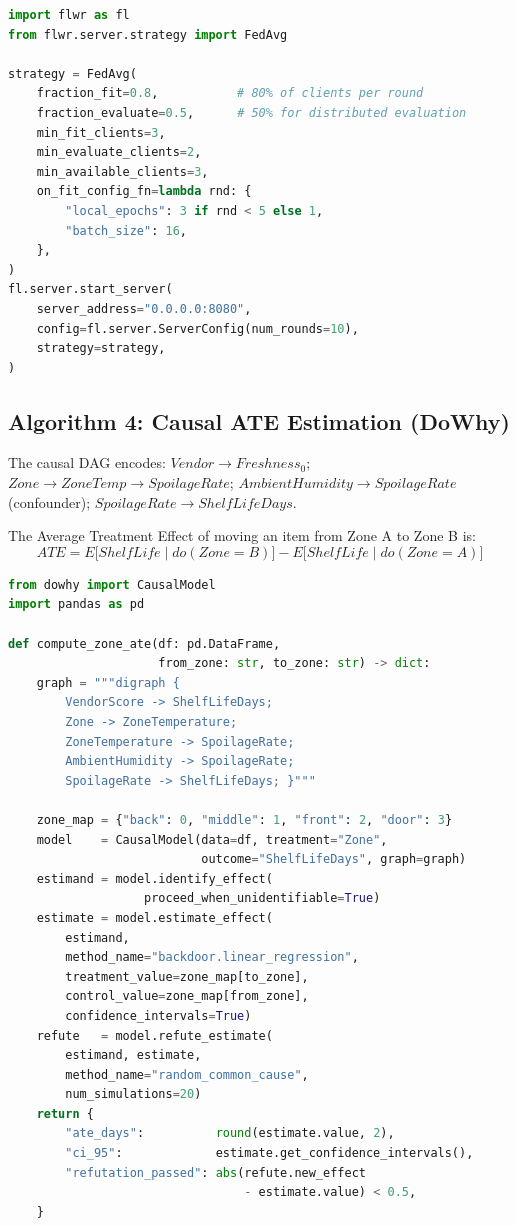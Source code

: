 \documentclass[12pt,a4paper]{report}
\begin{document}
\begin{lstlisting}[language=Python, caption={Flower Server: FedAvg Strategy Configuration}]
import flwr as fl
from flwr.server.strategy import FedAvg

strategy = FedAvg(
    fraction_fit=0.8,           # 80% of clients per round
    fraction_evaluate=0.5,      # 50% for distributed evaluation
    min_fit_clients=3,
    min_evaluate_clients=2,
    min_available_clients=3,
    on_fit_config_fn=lambda rnd: {
        "local_epochs": 3 if rnd < 5 else 1,
        "batch_size": 16,
    },
)
fl.server.start_server(
    server_address="0.0.0.0:8080",
    config=fl.server.ServerConfig(num_rounds=10),
    strategy=strategy,
)
\end{lstlisting}

\subsection{Algorithm 4: Causal ATE Estimation (DoWhy)}
The causal DAG encodes: $Vendor \rightarrow Freshness_0$; $Zone \rightarrow ZoneTemp \rightarrow SpoilageRate$; $AmbientHumidity \rightarrow SpoilageRate$ (confounder); $SpoilageRate \rightarrow ShelfLifeDays$.

The Average Treatment Effect of moving an item from Zone A to Zone B is:
\begin{equation}
    ATE = E\bigl[ShelfLife \mid do(Zone = B)\bigr] - E\bigl[ShelfLife \mid do(Zone = A)\bigr]
\end{equation}

\begin{lstlisting}[language=Python, caption={DoWhy Causal ATE Pipeline}]
from dowhy import CausalModel
import pandas as pd

def compute_zone_ate(df: pd.DataFrame,
                     from_zone: str, to_zone: str) -> dict:
    graph = """digraph {
        VendorScore -> ShelfLifeDays;
        Zone -> ZoneTemperature;
        ZoneTemperature -> SpoilageRate;
        AmbientHumidity -> SpoilageRate;
        SpoilageRate -> ShelfLifeDays; }"""

    zone_map = {"back": 0, "middle": 1, "front": 2, "door": 3}
    model    = CausalModel(data=df, treatment="Zone",
                           outcome="ShelfLifeDays", graph=graph)
    estimand = model.identify_effect(
                   proceed_when_unidentifiable=True)
    estimate = model.estimate_effect(
        estimand,
        method_name="backdoor.linear_regression",
        treatment_value=zone_map[to_zone],
        control_value=zone_map[from_zone],
        confidence_intervals=True)
    refute   = model.refute_estimate(
        estimand, estimate,
        method_name="random_common_cause",
        num_simulations=20)
    return {
        "ate_days":          round(estimate.value, 2),
        "ci_95":             estimate.get_confidence_intervals(),
        "refutation_passed": abs(refute.new_effect
                                 - estimate.value) < 0.5,
    }
\end{lstlisting}
\end{document}
